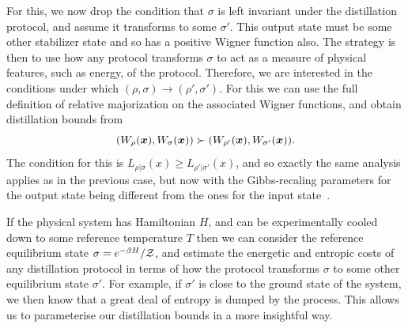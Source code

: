 \documentclass[pra,
aps,
twocolumn,
superscriptaddress,
groupedaddress,
nofootinbib,
reprint
]{revtex4-1}
\begin{document}
For this, we now drop the condition that $\sigma$ is left invariant under the distillation protocol, and assume it transforms to some $\sigma'$. This output state must be some other stabilizer state and so has a positive Wigner function also. The strategy is then to use how any protocol transforms $\sigma$ to act as a measure of physical features, such as energy, of the protocol. Therefore, we are interested in the conditions under which $(\rho, \sigma) \rightarrow (\rho', \sigma')$. For this we can use the full definition of relative majorization on the associated Wigner functions, and obtain distillation bounds from
\begin{equation}
(W_\rho(\boldsymbol{x}), W_\sigma(\boldsymbol{x}) ) \succ (W_{\rho'}(\boldsymbol{x}), W_{\sigma'}(\boldsymbol{x}) ).
\end{equation}
The condition for this is $L_{\rho |\sigma } (x) \ge L_{\rho'|\sigma'} (x)$, and so exactly the same analysis applies as in the previous case, but now with the Gibbs-recaling parameters for the output state being different from the ones for the input state~\cite{Renes_2016}.

If the physical system has Hamiltonian $H$, and can be experimentally cooled down to some reference temperature $T$ then we can consider the reference equilibrium state $\sigma = e^{-\beta H}/\mathcal{Z}$, and estimate the energetic and entropic costs of any distillation protocol in terms of how the protocol transforms $\sigma$ to some other equilibrium state $\sigma'$. For example, if $\sigma'$ is close to the ground state  of the system, we then know that a great deal of entropy is dumped by the process. This allows us to parameterise our distillation bounds in a more insightful way.
\end{document}
